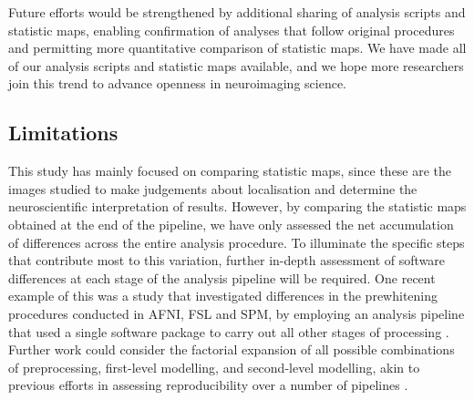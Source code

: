 Future efforts would be strengthened by additional sharing of analysis scripts and statistic maps, enabling confirmation of analyses that follow original procedures and permitting more quantitative comparison of statistic maps. We have made all of our analysis scripts and statistic maps available, and we hope more researchers join this trend to advance openness in neuroimaging science. 

\subsection{Limitations}

This study has mainly focused on comparing statistic maps, since these are the images studied to make judgements about localisation and determine the neuroscientific interpretation of results. However, by comparing the statistic maps obtained at the end of the pipeline, we have only assessed the net accumulation of differences across the entire analysis procedure. To illuminate the specific steps that contribute most to this variation, further in-depth assessment of software differences at each stage of the analysis pipeline will be required. One recent example of this was a study that investigated differences in the prewhitening procedures conducted in AFNI, FSL and SPM, by employing an analysis pipeline that used a single software package to carry out all other stages of processing \citep{Olszowy2019-cz}. Further work could consider the factorial expansion of all possible combinations of preprocessing, first-level modelling, and second-level modelling, akin to previous efforts in assessing reproducibility over a number of pipelines \citep{Strother2002-sz}.

